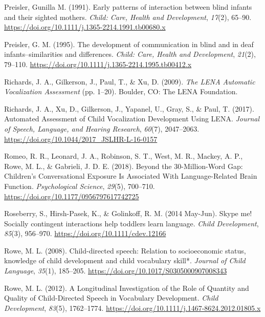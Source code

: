 \documentclass[
  man,floatsintext]{apa6}
\newlength{\cslhangindent}
\newlength{\cslentryspacingunit} %
\newenvironment{CSLReferences}[2] %
 {%
  \setlength{\parindent}{0pt}
  \ifodd #1
  \let\oldpar\par
  \def\par{\hangindent=\cslhangindent\oldpar}
  \fi
  \setlength{\parskip}{#2\cslentryspacingunit}
 }%
 {}
\begin{document}
\begin{CSLReferences}{1}{0}
\leavevmode{}%
Preisler, Gunilla M. (1991). Early patterns of interaction between blind infants and their sighted mothers. \emph{Child: Care, Health and Development}, \emph{17}(2), 65--90. \url{https://doi.org/10.1111/j.1365-2214.1991.tb00680.x}

\leavevmode{}%
Preisler, G. M. (1995). The development of communication in blind and in deaf infants--similarities and differences. \emph{Child: Care, Health and Development}, \emph{21}(2), 79--110. \url{https://doi.org/10.1111/j.1365-2214.1995.tb00412.x}

\leavevmode{}%
Richards, J. A., Gilkerson, J., Paul, T., \& Xu, D. (2009). \emph{The {LENA Automatic Vocalization Assessment}} (pp. 1--20). {Boulder, CO}: {The LENA Foundation}.

\leavevmode{}%
Richards, J. A., Xu, D., Gilkerson, J., Yapanel, U., Gray, S., \& Paul, T. (2017). Automated {Assessment} of {Child Vocalization Development Using LENA}. \emph{Journal of Speech, Language, and Hearing Research}, \emph{60}(7), 2047--2063. \url{https://doi.org/10.1044/2017_JSLHR-L-16-0157}

\leavevmode{}%
Romeo, R. R., Leonard, J. A., Robinson, S. T., West, M. R., Mackey, A. P., Rowe, M. L., \& Gabrieli, J. D. E. (2018). Beyond the 30-{Million-Word Gap}: {Children}'s {Conversational Exposure Is Associated With Language-Related Brain Function}. \emph{Psychological Science}, \emph{29}(5), 700--710. \url{https://doi.org/10.1177/0956797617742725}

\leavevmode{}%
Roseberry, S., Hirsh-Pasek, K., \& Golinkoff, R. M. (2014 May-Jun). Skype me! {Socially} contingent interactions help toddlers learn language. \emph{Child Development}, \emph{85}(3), 956--970. \url{https://doi.org/10.1111/cdev.12166}

\leavevmode{}%
Rowe, M. L. (2008). Child-directed speech: Relation to socioeconomic status, knowledge of child development and child vocabulary skill*. \emph{Journal of Child Language}, \emph{35}(1), 185--205. \url{https://doi.org/10.1017/S0305000907008343}

\leavevmode{}%
Rowe, M. L. (2012). A {Longitudinal Investigation} of the {Role} of {Quantity} and {Quality} of {Child-Directed Speech} in {Vocabulary Development}. \emph{Child Development}, \emph{83}(5), 1762--1774. \url{https://doi.org/10.1111/j.1467-8624.2012.01805.x}


\end{CSLReferences}
\end{document}
